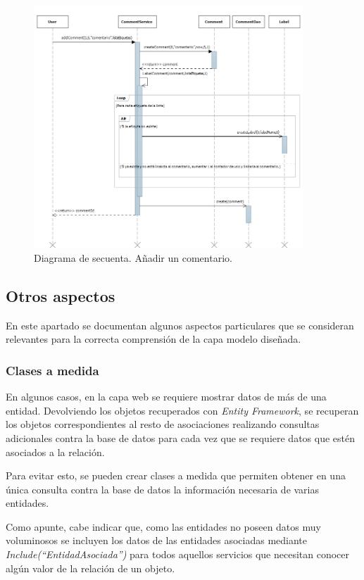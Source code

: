 \documentclass{article}
\begin{document}
\begin{figure}[h]
  \centering
    \includegraphics[width=0.9\textwidth]{img/AddCommentLabel.png}
  \caption{Diagrama de secuenta. Añadir un comentario.}
  \label{fig:AddCommentLabel}
\end{figure}		

\subsection{Otros aspectos}
	En este apartado se documentan algunos aspectos particulares que se consideran relevantes para la correcta comprensión de la capa modelo diseñada.
	
\subsubsection{Clases a medida}
	En algunos casos, en la capa web se requiere mostrar datos de más de una entidad. Devolviendo los objetos recuperados con \emph{Entity Framework}, se recuperan los objetos correspondientes al resto de asociaciones realizando consultas adicionales contra la base de datos para cada vez que se requiere datos que estén asociados a la relación.
	
	Para evitar esto, se pueden crear clases a medida que permiten obtener en una única consulta contra la base de datos la información necesaria de varias entidades.
	
	Como apunte, cabe indicar que, como las entidades no poseen datos muy voluminosos se incluyen los datos de las entidades asociadas mediante \emph{Include(``EntidadAsociada'')} para todos aquellos servicios que necesitan conocer algún valor de la relación de un objeto.
	
\end{document}
